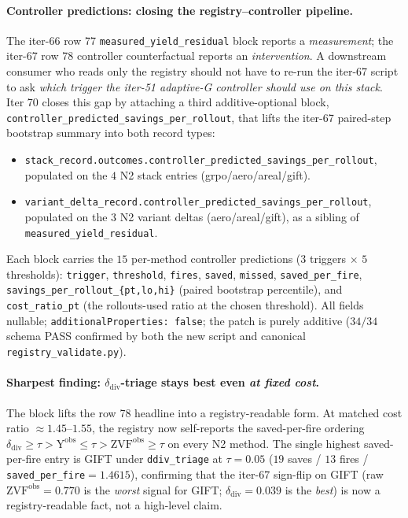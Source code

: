 \paragraph{Controller predictions: closing the registry--controller pipeline.}
The iter-66 row 77 \texttt{measured\_yield\_residual} block reports a
\emph{measurement}; the iter-67 row 78 controller counterfactual reports an
\emph{intervention}. A downstream consumer who reads only the registry should
not have to re-run the iter-67 script to ask \emph{which trigger the iter-51
adaptive-G controller should use on this stack}. Iter 70 closes this gap by
attaching a third additive-optional block,
\texttt{controller\_predicted\_savings\_per\_rollout}, that lifts the iter-67
paired-step bootstrap summary into both record types:
\begin{itemize}
  \item \texttt{stack\_record.outcomes.controller\_predicted\_savings\_per\_rollout},
        populated on the $4$ N2 stack entries (grpo/aero/areal/gift).
  \item \texttt{variant\_delta\_record.controller\_predicted\_savings\_per\_rollout},
        populated on the $3$ N2 variant deltas (aero/areal/gift), as a sibling
        of \texttt{measured\_yield\_residual}.
\end{itemize}
Each block carries the $15$ per-method controller predictions ($3$ triggers
$\times$ $5$ thresholds): \texttt{trigger}, \texttt{threshold}, \texttt{fires},
\texttt{saved}, \texttt{missed}, \texttt{saved\_per\_fire},
\texttt{savings\_per\_rollout\_\{pt,lo,hi\}} (paired bootstrap percentile),
and \texttt{cost\_ratio\_pt} (the rollouts-used ratio at the chosen
threshold). All fields nullable; \texttt{additionalProperties: false}; the
patch is purely additive ($34/34$ schema PASS confirmed by both the new
script and canonical \texttt{registry\_validate.py}).

\paragraph{Sharpest finding: $\delta_{\mathrm{div}}$-triage stays best even
\emph{at fixed cost}.}
The block lifts the row 78 headline into a registry-readable form. At matched
cost ratio $\approx 1.45$--$1.55$, the registry now self-reports the
saved-per-fire ordering $\delta_{\mathrm{div}}\geq\tau > \mathrm{Y^{obs}}\leq\tau
> \mathrm{ZVF^{obs}}\geq\tau$ on every N2 method. The single highest
saved-per-fire entry is GIFT under \texttt{ddiv\_triage} at $\tau=0.05$
($19$ saves / $13$ fires / \texttt{saved\_per\_fire}$=1.4615$), confirming
that the iter-67 sign-flip on GIFT (raw $\mathrm{ZVF^{obs}}=0.770$ is the
\emph{worst} signal for GIFT; $\delta_{\mathrm{div}}=0.039$ is the
\emph{best}) is now a registry-readable fact, not a high-level claim.

